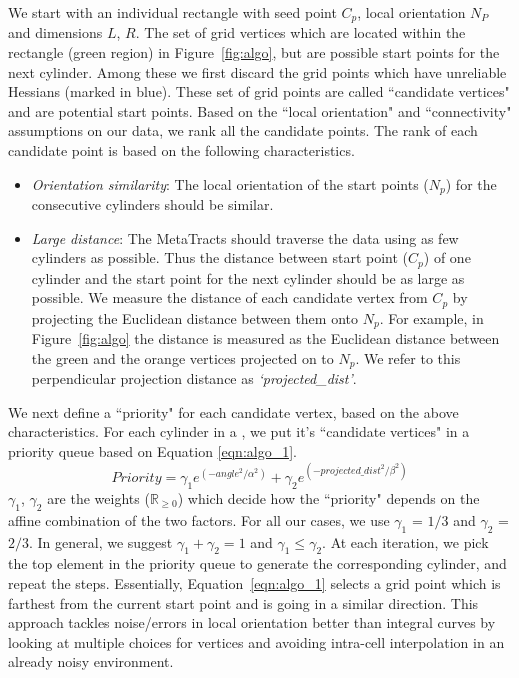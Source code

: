 We start with an individual rectangle with seed point $C_{p}$, local orientation $N_P$ and dimensions $L$, $R$. The set of grid vertices which are located within the rectangle (green region) in Figure~\ref{fig:algo}, but are possible start points for the next cylinder. Among these we first discard the grid points which have unreliable Hessians (marked in blue). These set of grid points are called ``candidate vertices" and are potential start points. Based on the ``local orientation" and ``connectivity" assumptions on our data, we rank all the candidate points. The rank of each candidate point is based on the following characteristics.
\begin{itemize}
\item \textit{Orientation similarity}: The local orientation of the start points ($N_p$) for the consecutive cylinders should be similar. 
\item \textit{Large distance}: The MetaTracts should traverse the data using as few cylinders as possible. Thus the distance between start point ($C_p$) of one cylinder and the start point for the next cylinder should be as large as possible. We measure the distance of each candidate vertex from $C_p$ by projecting the Euclidean distance between them onto $N_p$. For example, in Figure~\ref{fig:algo} the distance is measured as the Euclidean distance between the green and the orange vertices projected on to $N_p$. We refer to this perpendicular projection distance as \textit{`projected\_dist'}. 
\end{itemize}

We next define a ``priority" for each candidate vertex, based on the above characteristics. For each cylinder in a \mt, we put it's ``candidate vertices" in a priority queue based on Equation \ref{eqn:algo_1}.
\begin{equation}
Priority = \gamma_1 e^{(-angle^2 / \alpha^2)} + \gamma_2e^{(-projected\_dist^2 / \beta^2)}
\label{eqn:algo_1}
\end{equation}
$\gamma_1$, $\gamma_2$ are the  weights ($\mathbb{R}_{\ge 0}$)  which decide how the ``priority" depends on the affine combination of the two factors. For all our cases, we use $\gamma_1$ = $1 / 3 $ and $\gamma_2$ = $2 / 3$. In general, we suggest $\gamma_1 +\gamma_2 = 1 $ and $\gamma_1 \leq \gamma_2$. At each iteration, we pick the top element in the priority queue to generate the corresponding cylinder, and repeat the steps. Essentially, Equation~\ref{eqn:algo_1} selects a grid point which is farthest from the current start point and is going in a similar direction. This approach tackles noise/errors in local orientation better than integral curves by looking at multiple choices for vertices and avoiding intra-cell interpolation in an already noisy environment. 

